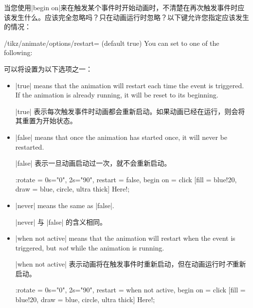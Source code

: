 当您使用|begin on|来在触发某个事件时开始动画时，不清楚在再次触发事件时应该发生什么。应该完全忽略吗？只在动画运行时忽略？以下键允许您指定应该发生的情况：

\begin{key}{/tikz/animate/options/restart= (default true)}
    You can set  to one of the following:
    
    可以将设置为以下选项之一：

    \begin{itemize}
        \item |true| means that the animation will restart each time the event
            is triggered. If the animation is already running, it will be reset
            to its beginning.

            |true| 表示每次触发事件时动画都会重新启动。如果动画已经在运行，则会将其重置为开始状态。


        \item |false| means that once the animation has started once, it will
            never be restarted.
            
            |false| 表示一旦动画启动过一次，就不会重新启动。


\begin{codeexample}[width=2cm,preamble={\usetikzlibrary{animations}}]
\tikz \node :rotate = { 0s="0", 2s="90",
                        restart = false, begin on = {click}}
    [fill = blue!20, draw = blue, circle, ultra thick] {Here!};
\end{codeexample}
        \item |never| means the same as |false|.

        |never| 与 |false| 的含义相同。


        \item |when not active| means that the animation will restart when the
            event is triggered, but \emph{not} while the animation is running.
            
            |when not active| 表示动画将在触发事件时重新启动，但在动画运行时\emph{不}重新启动。


\begin{codeexample}[width=2cm,preamble={\usetikzlibrary{animations}}]
\tikz \node :rotate = { 0s="0", 2s="90",
                        restart = when not active, begin on = {click}}
    [fill = blue!20, draw = blue, circle, ultra thick] {Here!};
\end{codeexample}
    \end{itemize}
\end{key}

